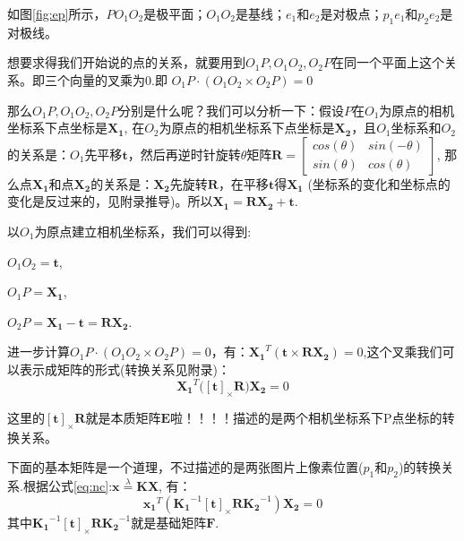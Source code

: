 \documentclass[12pt]{article}
\begin{document}
如图\ref{fig:ep}所示，$PO_1O_2$是极平面；$O_1O_2$是基线；$e_1$和$e_2$是对极点；$p_1e_1$和$p_2e_2$是对极线。

想要求得我们开始说的点的关系，就要用到$O_1P,O_1O_2,O_2P$在同一个平面上这个关系。即三个向量的叉乘为0.即
$O_1P\cdot (O_1O_2\times O_2P)=0$

那么$O_1P,O_1O_2,O_2P$分别是什么呢？我们可以分析一下：假设$P$在$O_1$为原点的相机坐标系下点坐标是$\mathbf{X_1}$,
在$O_2$为原点的相机坐标系下点坐标是$\mathbf{X_2}$，且$O_1$坐标系和$O_2$的关系是：$O_1$先平移$\mathbf{t}$，然后再逆时针旋转$\theta$矩阵$\mathbf{R}=\left[
    \begin{array}{ll}
        cos(\theta) & sin(-\theta)\\
        sin(\theta) & cos(\theta)
    \end{array}
\right]$,
那么点$\mathbf{X_1}$和点$\mathbf{X_2}$的关系是：$\mathbf{X_2}$先旋转$\mathbf{R}$，在平移$\mathbf{t}$得$\mathbf{X_1}$
(坐标系的变化和坐标点的变化是反过来的，见附录推导)。所以$\mathbf{X_1}=\mathbf{RX_2}+\mathbf{t}$.

以$O_1$为原点建立相机坐标系，我们可以得到:

$O_1O_2=\mathbf{t}$,

$O_1P=\mathbf{X_1}$,

$O_2P=\mathbf{X_1-t=RX_2}$.

进一步计算$O_1P\cdot (O_1O_2\times O_2P)=0$，有：$\mathbf{X_1}^T(\mathbf{t\times RX_2})=0$,这个叉乘我们可以表示成矩阵的形式(转换关系见附录)：
\begin{equation}
    \mathbf{X_1}^T(\mathbf{[t]}_\times\mathbf{R)X_2}=0
\end{equation}

这里的$\mathbf{[t]}_\times\mathbf{R}$就是本质矩阵$\mathbf{E}$啦！！！！描述的是两个相机坐标系下P点坐标的转换关系。

下面的基本矩阵是一个道理，不过描述的是两张图片上像素位置($p_1$和$p_2$)的转换关系.根据公式\ref{eq:nc}:$\mathbf{x}\overset{\lambda}{=}\mathbf{KX}$,
有：
\begin{equation}
    \mathbf{x_1}^T(\mathbf{K_1}^{-1}[\mathbf{t}]_\times \mathbf{RK_2}^{-1})\mathbf{X_2}=0
\end{equation}
其中$\mathbf{K_1}^{-1}[\mathbf{t}]_\times \mathbf{RK_2}^{-1}$就是基础矩阵$\mathbf{F}$.
\end{document}
